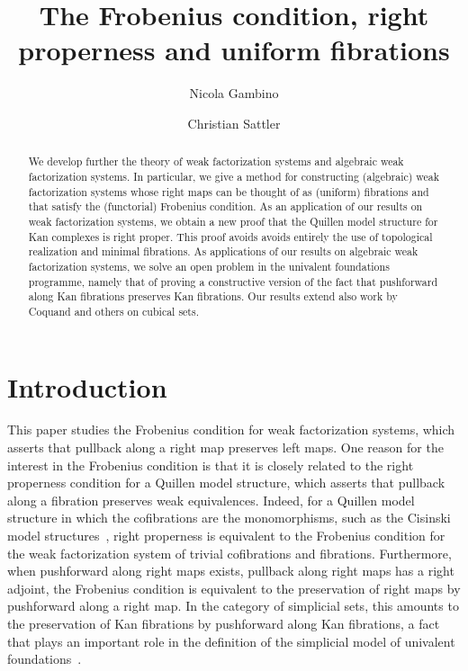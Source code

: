 \documentclass[reqno,10pt,a4paper,oneside,draft]{amsart}
\title{The Frobenius condition, right properness \linebreak and uniform fibrations}
\begin{document}
\begin{abstract}
We develop further the theory of weak factorization systems and algebraic weak factorization systems. In particular, we give a method for constructing (algebraic) weak factorization systems whose
right maps can be thought of as (uniform) fibrations and that satisfy the  (functorial) Frobenius condition. As an application of our results on weak factorization systems, we obtain a new proof that the Quillen model structure for Kan complexes is right proper. This proof avoids
avoids entirely the use of topological realization and minimal fibrations. As applications of our results on algebraic weak factorization systems, we solve an open problem in the univalent foundations programme, namely that of proving a constructive version of the fact that pushforward along Kan fibrations preserves Kan fibrations. Our results extend also work by Coquand and others on cubical
sets.
\end{abstract}

\author{Nicola Gambino}
\address{School of Mathematics, University of Leeds, Leeds LS2 9JT, UK}

\author{Christian Sattler}
\address{School of Mathematics, University of Leeds, Leeds LS2 9JT, UK}


\maketitle




\section*{Introduction}

This paper studies the Frobenius condition for weak factorization systems, which asserts that pullback along a right map preserves left maps. One reason for the interest in the Frobenius condition is that it is closely related to the right properness condition for a Quillen model structure, which asserts that pullback along a fibration preserves weak equivalences.
Indeed, for a Quillen model structure in which the cofibrations are the monomorphisms, such as the Cisinski model structures~\cite{cisinski-asterisque}, right properness is equivalent to the Frobenius condition for the weak factorization system of trivial cofibrations and fibrations.
Furthermore, when pushforward along right maps exists, \ie pullback along right maps has a right adjoint, the Frobenius condition is equivalent to the preservation of right maps by pushforward along a right map.
In the category of simplicial sets, this amounts  to the preservation of Kan fibrations by pushforward along Kan fibrations, a fact that plays an important role in the definition of the simplicial model of univalent foundations~\cite[Lemma~2.3.1]{voevodsky-simplicial-model}.
\end{document}
